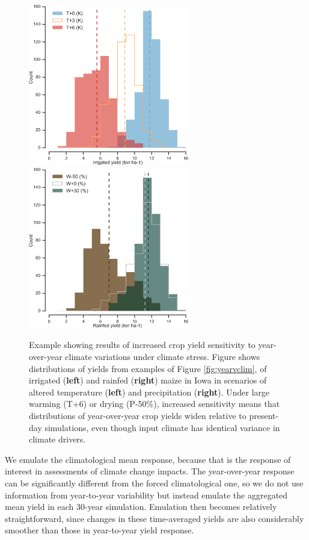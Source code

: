 \documentclass[gmd, manuscript]{copernicus} %
\begin{document}
\begin{figure}[ht]
\centering
   \includegraphics[width=7cm]{figures/hist_year_t.png} \hspace{10mm} \includegraphics[width=7cm]{figures/hist_year_pr.png}
   \caption{
   Example showing results of increased crop yield sensitivity to year-over-year climate variations under climate stress. 
   Figure shows distributions of yields from examples of Figure \ref{fig:yearvclim}, of irrigated (\textbf{left}) and rainfed (\textbf{right}) maize in Iowa in scenarios of altered temperature (\textbf{left}) and precipitation (\textbf{right}).
   Under large warming (T+6) or drying (P-50\%), increased sensitivity means that distributions of year-over-year crop yields widen relative to present-day simulations, even though input climate has identical variance in climate drivers.
   }
   \label{fig:yearly}
\end{figure}

We emulate the climatological mean response, because that is the response of interest in assessments of climate change impacts. 
The year-over-year response can be significantly different from the forced climatological one, so we do not use information from year-to-year variability but instead emulate the aggregated mean yield in each 30-year simulation. 
Emulation then becomes relatively straightforward, since changes in these time-averaged yields are also considerably smoother than those in year-to-year yield response.
\end{document}
